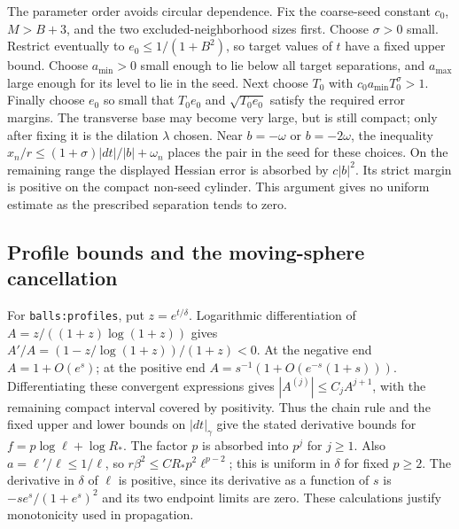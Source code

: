 \documentclass[11pt]{article}
\theoremstyle{definition}
\theoremstyle{remark}
\numberwithin{equation}{section}
\begin{document}
The parameter order avoids circular dependence. Fix the coarse-seed
constant $c_0$, $M>B+3$, and the two excluded-neighborhood sizes first.
Choose $\sigma>0$ small. Restrict eventually to
$e_0\le1/(1+B^2)$, so target values of $t$ have a fixed upper bound.
Choose $a_{\min}>0$ small enough to lie below all target separations,
and $a_{\max}$ large enough for its level to lie in the seed. Next choose
$T_0$ with $c_0a_{\min}T_0^\sigma>1$. Finally choose $e_0$ so small that
$T_0e_0$ and $\sqrt{T_0e_0}$ satisfy the required error margins.
The transverse base may become very large, but is still compact; only
after fixing it is the dilation $\lambda$ chosen. Near $b=-\omega$ or
$b=-2\omega$, the inequality
$x_n/r\le(1+\sigma)|dt|/|b|+\omega_n$ places the pair in the seed
for these choices. On the remaining range the displayed Hessian error
is absorbed by $c|b|^2$. Its strict margin is positive on the compact
non-seed cylinder. This argument gives no uniform estimate as the
prescribed separation tends to zero.

\subsection{Profile bounds and the moving-sphere cancellation}
\label{cross-expanded:spheres}
For \texttt{balls:profiles}, put $z=e^{t/\delta}$.
Logarithmic differentiation of
$A=z/((1+z)\log(1+z))$ gives
$A'/A=(1-z/\log(1+z))/(1+z)<0$.
At the negative end $A=1+O(e^s)$; at the positive end
$A=s^{-1}(1+O(e^{-s}(1+s)))$. Differentiating these convergent
expressions gives $|A^{(j)}|\le C_j A^{j+1}$, with the remaining
compact interval covered by positivity. Thus the chain rule and the fixed
upper and lower bounds on $|dt|_\gamma$ give the stated derivative bounds
for $f=p\log\ell+\log R_*$. The factor $p$ is absorbed into $p^j$ for
$j\ge1$. Also $a=\ell'/\ell\le1/\ell$, so
$r\beta^2\le C R_*p^2\ell^{p-2}$; this is uniform in $\delta$ for fixed
$p\ge2$. The derivative in $\delta$ of $\ell$ is positive, since its
derivative as a function of $s$ is $-s e^s/(1+e^s)^2$ and its two endpoint
limits are zero. These calculations justify monotonicity used in propagation.
\end{document}
